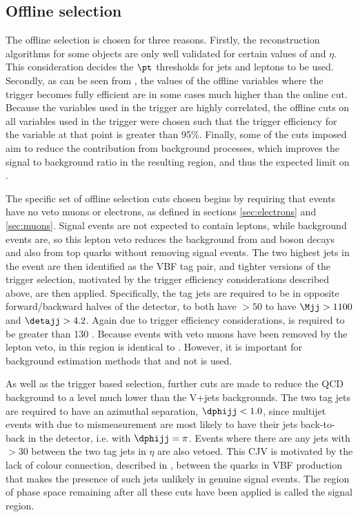\subsection{Offline selection}
\label{sec:promptofflinesel}
The offline selection is chosen for three reasons. Firstly, the reconstruction algorithms for some objects are only well validated for certain values of \pt and $\eta$. This consideration decides the $\pt$ thresholds for jets and leptons to be used. Secondly, as can be seen from , the values of the offline variables where the trigger becomes fully efficient are in some cases much higher than the online cut. Because the variables used in the trigger are highly correlated, the offline cuts on all variables used in the trigger were chosen such that the trigger efficiency for the variable at that point is greater than 95\%. Finally, some of the cuts imposed aim to reduce the contribution from background processes, which improves the signal to background ratio in the resulting region, and thus the expected limit on \BRinv.

The specific set of offline selection cuts chosen begins by requiring that events have no veto muons or electrons, as defined in sections \ref{sec:electrons} and \ref{sec:muons}. Signal events are not expected to contain leptons, while background events are, so this lepton veto reduces the background from \PW and \PZ boson decays and also from top quarks without removing signal events. The two highest \pt jets in the event are then identified as the VBF tag pair, and tighter versions of the trigger selection, motivated by the trigger efficiency considerations described above, are then applied. Specifically, the tag jets are required to be in opposite forward/backward halves of the detector, to both have \pt$>50$ \GeV to have $\Mjj>1100$ \GeV and $\detajj>4.2$. Again due to trigger efficiency considerations, \METnoMU is required to be greater than 130 \GeV.  Because events with veto muons have been removed by the lepton veto, \METnoMU in this region is identical to \MET. However, it is important for background estimation methods that \METnoMU and not \MET is used.

As well as the trigger based selection, further cuts are made to reduce the \ac{QCD} background to a level much lower than the V+jets backgrounds. The two tag jets are required to have an azimuthal separation, $\dphijj<1.0$, since multijet events with \MET due to mismeasurement are most likely to have their jets back-to-back in the detector, i.e. with $\dphijj=\pi$. Events where there are any jets with \pt$>30$ \GeV between the two tag jets in $\eta$ are also vetoed. This \ac{CJV} is motivated by the lack of colour connection, described in , between the quarks in VBF production that makes the presence of such jets unlikely in genuine signal events. The region of phase space remaining after all these cuts have been applied is called the signal region.

